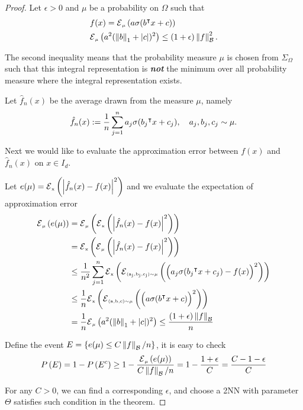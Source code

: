 \begin{proof}

Let $\epsilon >0$ and $\mu$ be a probability on $\Omega$ such that
\begin{align}
    &f(x) 
    = \ERWi{\mu}{a \sigma(b\tr x + c)} \\
    &\ERWi{\mu}{a^2 (\norm{b}_1 + \abs{c})^2} 
    \leq (1+\epsilon) \norm{f}_{\mcal{B}}^2.
\end{align}

The second inequality means that the probability measure $\mu$ is chosen from
$\Sigma_{\Omega}$ such that this integral representation is
\textbf{\textit{not}} the minimum over all probability measure where the
integral representation exists.

Let $\hat{f}_n(x)$ be the average drawn from the measure $\mu$, namely
\begin{equation}
    \hat{f}_n(x) := \frac{1}{n} \sum_{j=1}^n 
    a_j \sigma(b_j{}^{\intercal} x + c_j), \quad a_j, b_j, c_j \sim \mu.
\end{equation}

Next we would like to evaluate the approximation error between $f(x)$ and
$\hat{f}_n(x)$ on $x \in I_d$.

Let $e(\mu) = \ERWi{x}{\abs{\hat{f}_n(x) - f(x)}^2}$ and we evaluate the
expectation of approximation error
\begin{align}
    \ERWi{\mu}{e(\mu)} 
    &=
    \ERWi{\mu}{
        \ERWi{x}{
            \abs{\hat{f}_n(x) - f(x)}^2
        }
    } \\
    &= \ERWi{x}{
        \ERWi{\mu}{
            \abs{\hat{f}_n(x) - f(x)}^2
        }
    } \\
    &\leq \frac{1}{n^2} \sum_{j=1}^n \ERWi{x}{
        \ERWi{(a_j,b_j,c_j)\sim\mu}{ 
            \Big(a_j \sigma(b_j\tr x + c_j) - f(x)\Big)^2    
        }
    } \\
    &\leq \frac{1}{n} \ERWi{x}{
        \ERWi{(a,b,c)\sim\mu}{ 
            \Big(a \sigma(b\tr x + c)\Big)^2
        }
    } \\
    &= \frac{1}{n} \ERWi{\mu}{a^2 (\norm{b}_1 + \abs{c})^2} 
    \leq \frac{(1+\epsilon)\norm{f}_{\mcal{B}}}{n}
\end{align}

Define the event $E = \{e(\mu) \leq C \left\| f \right\|_{\mathcal{B}}/n\}$, it is easy to
check
\begin{equation}
    \PR{E} = 1 - \PR{E^c} \geq 
    1 - \frac{\ERWi{\mu}{e(\mu)}}{C \norm{f}_{\mcal{B}}/n} =
    1 - \frac{1+\epsilon}{C} =
    \frac{C - 1 - \epsilon}{C}
\end{equation}

For any $C > 0$, we can find a corresponding $\epsilon$, and choose a 2NN with
parameter $\Theta$ satisfies such condition in the theorem.

\end{proof}



